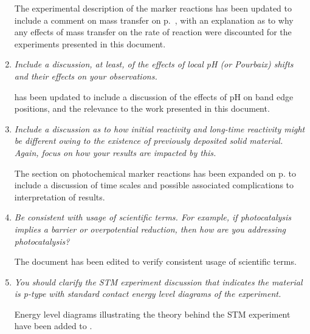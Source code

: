 \documentclass[12pt,%
               letterpaper,
               oneside]{uiothesis}
\begin{document}
\begin{enum}
\begin{enumerate}[label=\alph*,leftmargin=1em]
  The experimental description of the marker reactions has been updated to include a
comment on mass transfer on p.~\pageref{masstransfer}, with an explanation as to why any
effects of mass transfer on the rate of reaction were discounted for the experiments
presented in this document.\vspace{16pt}
  
  \item \emph{Include a discussion, at least, of the effects of local pH (or Pourbaix)
shifts and their effects on your observations.}\vspace{8pt}
  
   has been updated to include a discussion of the
effects of pH on band edge positions, and the relevance to the work presented in this
document.
 
  \vspace{16pt}
  
  \item \emph{Include a discussion as to how initial reactivity and long-time reactivity
might be different owing to the existence of previously deposited solid material. Again,
focus on how your results are impacted by this.}\vspace{8pt}
  
  The section on photochemical marker reactions has been expanded on p.
\pageref{timescales} to include a discussion of time scales and possible associated
complications to interpretation of results.
  
  \vspace{16pt}
  
  \item \emph{Be consistent with usage of scientific terms. For example, if photocatalysis
implies a barrier or overpotential reduction, then how are you addressing
photocatalysis?}\vspace{8pt}
  
  The document has been edited to verify consistent usage of scientific terms.
  
  \vspace{16pt}
  
  \item \emph{You should clarify the STM experiment discussion that indicates the material
is p-type with standard contact energy level diagrams of the experiment.}\vspace{8pt}
  
  Energy level diagrams illustrating the theory behind the STM experiment have been added
to .\vspace{16pt}
  

\end{enumerate}
\end{enum}
\end{document}
